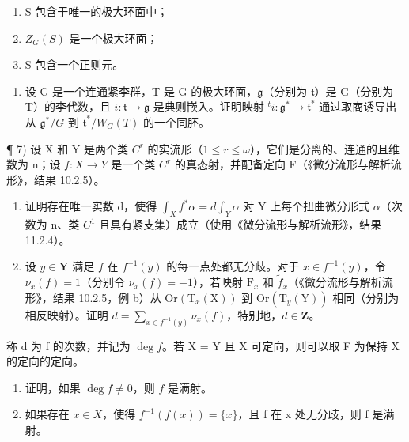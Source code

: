 \begin{enumerate}
\def\labelenumi{(\roman{enumi})}
\item
  S 包含于唯一的极大环面中；
\item
  \(Z_{G}(S)\) 是一个极大环面；
\item
  S 包含一个正则元。
\end{enumerate}

\begin{enumerate}
\def\labelenumi{\arabic{enumi})}
\setcounter{enumi}{5}
\tightlist
\item
  设 G 是一个连通紧李群，T 是 G 的极大环面，\(\mathfrak{g}\)（分别为 \(\mathfrak{t}\)）是 G（分别为 T）的李代数，且 \(i : \mathfrak{t} \to \mathfrak{g}\) 是典则嵌入。证明映射 \(^{t}i : \mathfrak{g}^{*} \to \mathfrak{t}^{*}\) 通过取商诱导出从 \(\mathfrak{g}^{*}/G\) 到 \(\mathfrak{t}^{*}/W_{G}(T)\) 的一个同胚。
\end{enumerate}

¶ 7) 设 X 和 Y 是两个类 \(C^{r}\) 的实流形（\(1 \leq r \leq \omega\)），它们是分离的、连通的且维数为 n；设 \(f : X \to Y\) 是一个类 \(C^{r}\) 的真态射，并配备定向 F（《微分流形与解析流形》，结果 10.2.5）。

\begin{enumerate}
\def\labelenumi{\alph{enumi})}
\item
  证明存在唯一实数 d，使得 \(\int_{X} f^{*}\alpha = d\int_{Y}\alpha\) 对 Y 上每个扭曲微分形式 \(\alpha\)（次数为 n、类 \(C^{1}\) 且具有紧支集）成立（使用《微分流形与解析流形》，结果 11.2.4）。
\item
  设 \(y \in \mathbf{Y}\) 满足 \(f\) 在 \(f^{-1}(y)\) 的每一点处都无分歧。对于 \(x \in f^{-1}(y)\)，令 \(\nu_x(f) = 1\)（分别令 \(\nu_x(f) = -1\)），若映射 \(\mathrm{F}_x\) 和 \(\tilde{f}_x\)（《微分流形与解析流形》，结果 10.2.5，例 b）从 \(\mathrm{Or}(\mathrm{T}_x(\mathrm{X}))\) 到 \(\mathrm{Or}(\mathrm{T}_y(\mathrm{Y}))\) 相同（分别为相反映射）。证明 \(d = \sum_{x \in f^{-1}(y)} \nu_x(f)\)，特别地，\(d \in \mathbf{Z}\)。
\end{enumerate}

称 d 为 f 的次数，并记为 \(\deg f\)。若 X = Y 且 X 可定向，则可以取 F 为保持 X 的定向的定向。

\begin{enumerate}
\def\labelenumi{\alph{enumi})}
\setcounter{enumi}{2}
\item
  证明，如果 \(\deg f \neq 0\)，则 \(f\) 是满射。
\item
  如果存在 \(x \in X\)，使得 \(f^{-1}(f(x)) = \{x\}\)，且 f 在 x 处无分歧，则 f 是满射。
\end{enumerate}


